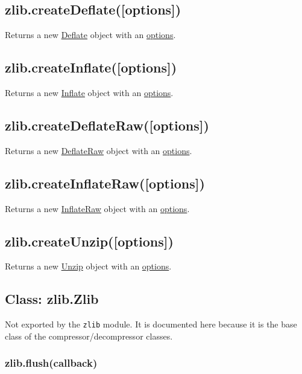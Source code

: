 \subsection{zlib.createDeflate({[}options{]})}

Returns a new \hyperref[zlib_class_zlib_deflate]{Deflate} object with
an \hyperref[zlib_options]{options}.

\subsection{zlib.createInflate({[}options{]})}

Returns a new \hyperref[zlib_class_zlib_inflate]{Inflate} object with
an \hyperref[zlib_options]{options}.

\subsection{zlib.createDeflateRaw({[}options{]})}

Returns a new \hyperref[zlib_class_zlib_deflateraw]{DeflateRaw}
object with an \hyperref[zlib_options]{options}.

\subsection{zlib.createInflateRaw({[}options{]})}

Returns a new \hyperref[zlib_class_zlib_inflateraw]{InflateRaw}
object with an \hyperref[zlib_options]{options}.

\subsection{zlib.createUnzip({[}options{]})}

Returns a new \hyperref[zlib_class_zlib_unzip]{Unzip} object with an
\hyperref[zlib_options]{options}.

\subsection{Class: zlib.Zlib}

Not exported by the \texttt{zlib} module. It is documented here because
it is the base class of the compressor/decompressor classes.

\subsubsection{zlib.flush(callback)}

